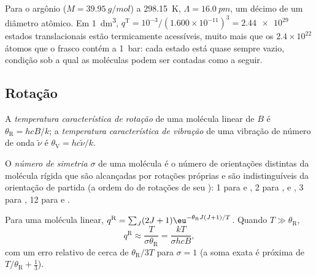\begin{example}\label{ex:b3:partition-functions:argon}
Para o argônio ($M = \qty{39.95}{g/mol}$) a \qty{298.15}{K}, $\Lambda = \qty{16.0}{pm}$, um décimo
de um diâmetro atômico. Em \qty{1}{dm^3}, $q^{\mathrm T} = 10^{-3}/(1.600\times10^{-11})^3 = \num{2.44e29}$
estados translacionais estão termicamente acessíveis, muito mais que os
$2.4\times10^{22}$ átomos que o frasco contém a \qty{1}{bar}: cada estado está quase
sempre vazio, condição sob a qual as moléculas podem ser contadas como a seguir.
\end{example}

\subsection*{Rotação}

\begin{definition}\label{def:b3:partition-functions:characteristic-temperature}
A \emph{temperatura característica de rotação}
de uma molécula linear de  $B$ é $\theta_{\mathrm R} =
hcB/k$; a \emph{temperatura característica de vibração}
de uma vibração de número de onda $\tilde\nu$ é $\theta_{\mathrm V} =
hc\tilde\nu/k$.
\end{definition}

\begin{definition}\label{def:b3:partition-functions:symmetry-number}
O \emph{número de simetria} $\sigma$ de uma molécula é o
número de orientações distintas da molécula rígida que são alcançadas por
rotações próprias e são indistinguíveis da orientação de partida (a ordem do
 de rotações de seu ): 1 para  e , 2 para ,
 e , 3 para , 12 para  e .
\end{definition}

\begin{proposition}\label{prop:b3:partition-functions:q-rot}
Para uma molécula linear, $q^{\mathrm R} = \sum_J(2J+1)\eu^{-\theta_{\mathrm R}J(J+1)/T}$. Quando $T \gg
\theta_{\mathrm R}$,
\[
  q^{\mathrm R} \approx \frac{T}{\sigma\theta_{\mathrm R}} = \frac{kT}{\sigma hcB},
\]
com um erro relativo de cerca de $\theta_{\mathrm R}/3T$ para $\sigma = 1$ (a soma exata é próxima
de $T/\theta_{\mathrm R} + \frac13$).
\end{proposition}


